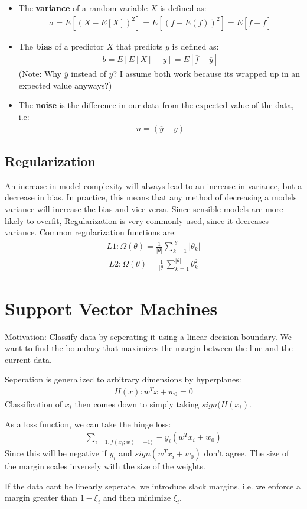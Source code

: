 \documentclass{report}
\newcommand{\tbf}{\textbf}
\newcommand*{\newpar}{\par\vspace{\baselineskip}\noindent}
\begin{document}
\begin{itemize}
 \item The \tbf{variance} of a random variable $X$ is defined as:
 \begin{align}
  \sigma = E[(X - E[X])^2] = E[(f - E(f))^2] = E[f - \overline{f}]
 \end{align}
 \item The \tbf{bias} of a predictor $X$ that predicts $y$ is defined as:
 \begin{align}
  b = E[E[X] - y] = E[\overline{f} - \overline{y}]
 \end{align}
 (Note: Why $\overline{y}$ instead of $y$? I assume both work because its wrapped up in an expected value anyways?)
 \item The \tbf{noise} is the difference in our data from the expected value of the data, i.e:
 \begin{align}
  n = (\overline{y} - y)
 \end{align}
\end{itemize}
%
\section{Regularization}
An increase in model complexity will always lead to an increase in variance, but a decrease in bias. In practice, this means that any method of decreasing a models variance will increase the bias and vice versa. Since sensible models are more likely to overfit, Regularization is very commonly used, since it decreases variance. Common regularization functions are:
\begin{align}
 L1: \Omega(\theta) = \frac{1}{|\theta|} \sum_{k=1}^{|\theta|} |\theta_k|
\end{align}
\begin{align}
 L2: \Omega(\theta) = \frac{1}{|\theta|} \sum_{k=1}^{|\theta|} \theta_k^2
\end{align}
%
\chapter{Support Vector Machines}
Motivation: Classify data by seperating it using a linear decision boundary. We want to find the boundary that maximizes the margin between the line and the current data.
\newpar
Seperation is generalized to arbitrary dimensions by hyperplanes:
\begin{align}
 H(x): w^T x + w_0 = 0
\end{align}
Classification of $x_i$ then comes down to simply taking $sign(H(x_i)$.
\newpar
As a loss function, we can take the hinge loss:
\begin{align}
 \sum_{i=1,f(x_i;w) = -1)} -y_i(w^Tx_i + w_0)
\end{align}
Since this will be negative if $y_i$ and $sign(w^Tx_i + w_0)$ don't agree.
The size of the margin scales inversely with the size of the weights.
\newpar
If the data cant be linearly seperate, we introduce slack margins, i.e. we enforce a margin greater than $1 - \xi_i$ and then minimize $\xi_i$.
%
\end{document}
